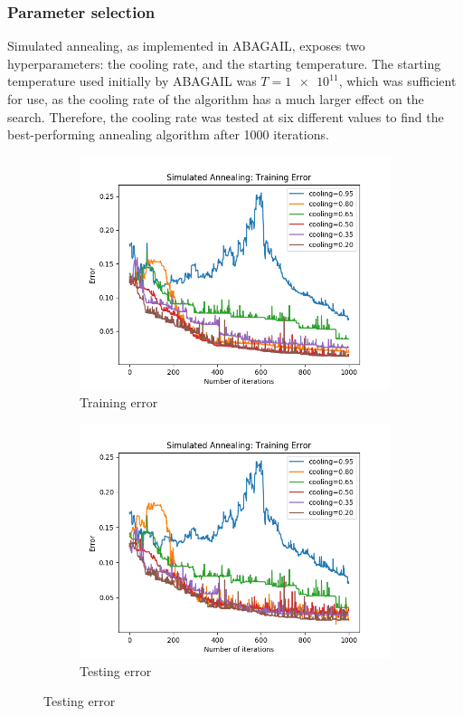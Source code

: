 \documentclass{article}
\begin{document}
      \subsubsection{Parameter selection}
        Simulated annealing, as implemented in ABAGAIL, exposes two hyperparameters: the cooling rate, and the starting temperature. The starting temperature used initially by ABAGAIL was $T = \num{1e11}$, which was sufficient for use, as the cooling rate of the algorithm has a much larger effect on the search. Therefore, the cooling rate was tested at six different values to find the best-performing annealing algorithm after 1000 iterations.

        \begin{figure}[htb]
        \centering

        \begin{subfigure}{0.5\textwidth}
          \includegraphics[width=\linewidth]{out/sa/cooling-error-training.png}
          \caption{Training error}
          \label{fig:sa-params-1}
        \end{subfigure}\hfil
        \begin{subfigure}{0.5\textwidth}
          \includegraphics[width=\linewidth]{out/sa/cooling-error-testing.png}
          \caption{Testing error}
          \label{fig:sa-params-2}
        \end{subfigure}


\end{figure}
\end{document}

